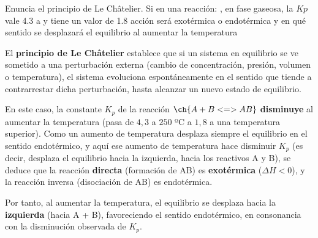 \begin{exercise}    %
    Enuncia el principio de Le Châtelier.
    Si en una reacción: , en fase gaseosa, la \(Kp\) vale \num{4,3} a  y tiene un valor de \num{1,8} acción será exotérmica o endotérmica y en qué sentido se desplazará el equilibrio al aumentar la temperatura
    \begin{solu}
        El \textbf{principio de Le Châtelier} establece que si un sistema en equilibrio se ve sometido a una perturbación externa (cambio de concentración, presión, volumen o temperatura), el sistema evoluciona espontáneamente en el sentido que tiende a contrarrestar dicha perturbación, hasta alcanzar un nuevo estado de equilibrio.

        En este caso, la constante \(K_p\) de la reacción \(\ch{A + B <=> AB}\) \textbf{disminuye} al aumentar la temperatura (pasa de \(4{,}3\) a \(250\) ºC a \(1{,}8\) a una temperatura superior). Como un aumento de temperatura desplaza siempre el equilibrio en el sentido endotérmico, y aquí ese aumento de temperatura hace disminuir \(K_p\) (es decir, desplaza el equilibrio hacia la izquierda, hacia los reactivos A y B), se deduce que la reacción \textbf{directa} (formación de AB) es \textbf{exotérmica} (\(\Delta H<0\)), y la reacción inversa (disociación de AB) es endotérmica.

        Por tanto, al aumentar la temperatura, el equilibrio se desplaza hacia la \textbf{izquierda} (hacia A + B), favoreciendo el sentido endotérmico, en consonancia con la disminución observada de \(K_p\).
    \end{solu}
\end{exercise}

